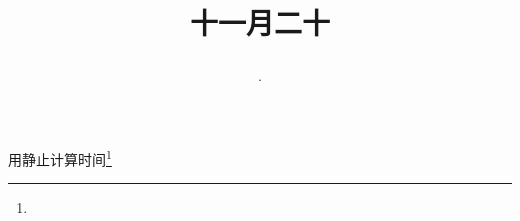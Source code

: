 \title{\date[d=20,m=12,y=2024][year:cn-y,年,month:cn,day:cn,日,·,weekday]·十一月二十 }
用静止计算时间\footnote{ }

